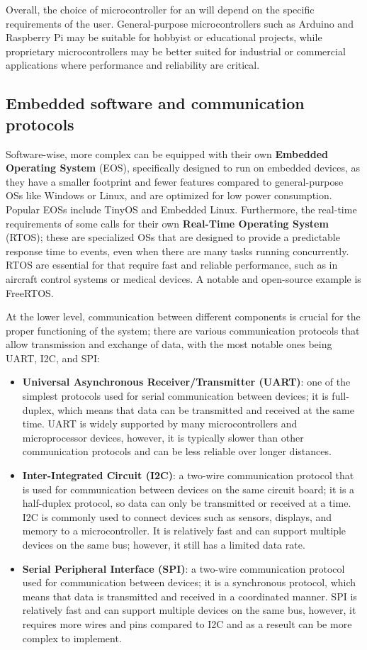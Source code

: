 Overall, the choice of microcontroller for an \es will depend on the specific requirements of the user. General-purpose microcontrollers such as Arduino and Raspberry Pi may be suitable for hobbyist or educational projects, while proprietary microcontrollers may be better suited for industrial or commercial applications where performance and reliability are critical.


\subsection{Embedded software and communication protocols}
Software-wise, more complex \ess can be equipped with their own \textbf{Embedded Operating System} (EOS), specifically designed to run on embedded devices, as they have a smaller footprint and fewer features compared to general-purpose OSs like Windows or Linux, and are optimized  for low power consumption. Popular EOSs include TinyOS and Embedded Linux.
Furthermore, the real-time requirements of some \ess calls for their own \textbf{Real-Time Operating System} (RTOS); these are specialized OSs that are designed to provide a predictable response time to events, even when there are many tasks running concurrently. RTOS are essential for \es that require fast and reliable performance, such as in aircraft control systems or medical devices. A notable and open-source example is FreeRTOS. 


At the lower level, communication between different components is crucial for the proper functioning of the system; there are various communication protocols that allow transmission and exchange of data, with the most notable ones being UART, I2C, and SPI:
\begin{itemize}
    \item \textbf{Universal Asynchronous Receiver/Transmitter (UART)}: one of the simplest protocols used for serial communication between devices; it is full-duplex, which means that data can be transmitted and received at the same time. UART is widely supported by many microcontrollers and microprocessor devices, however, it is typically slower than other communication protocols and can be less reliable over longer distances.
    \item \textbf{Inter-Integrated Circuit (I2C)}: a two-wire communication protocol that is used for communication between devices on the same circuit board; it is a half-duplex protocol, so data can only be transmitted or received at a time. I2C is commonly used to connect devices such as sensors, displays, and memory to a microcontroller. It is relatively fast and can support multiple devices on the same bus; however, it still has a limited data rate.
    \item \textbf{Serial Peripheral Interface (SPI)}: a two-wire communication protocol used for communication between devices; it is a synchronous protocol, which means that data is transmitted and received in a coordinated manner. SPI is relatively fast and can support multiple devices on the same bus, however, it requires more wires and pins compared to I2C and as a reseult can be more complex to implement.
\end{itemize} 


